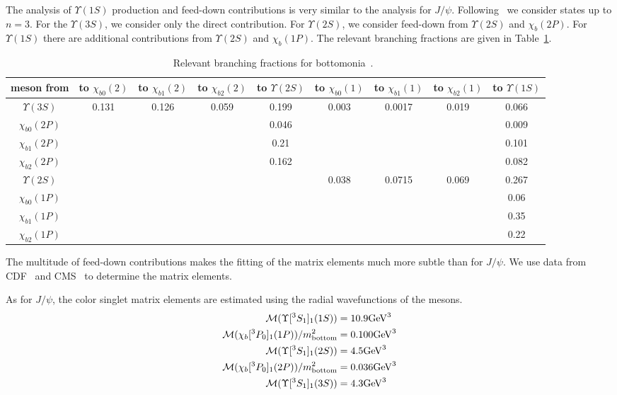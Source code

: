 \documentclass[article,showpacs,preprintnumbers,amsmath,amssymb]{revtex4}
\newcommand{\rGeV}{{\rm GeV}}
\newcommand{\bottom}{{\rm{bottom}}}
\begin{document}
\begin{appendix}
The analysis of $\Upsilon(1S)$ production and feed-down contributions is very
similar to the analysis for $J/\psi$. Following~\cite{Cho:1995ce,Cho:1995vh}
we consider states up to $n=3$. For the $\Upsilon(3S)$, we consider only the
direct contribution. For $\Upsilon(2S)$, we consider feed-down from
$\Upsilon(2S)$ and $\chi_b(2P)$. For $\Upsilon(1S)$ there are additional
contributions from $\Upsilon(2S)$ and $\chi_b(1P)$. The relevant branching
fractions are given in Table~\ref{table:BottomoniaBFs}.
\begin{table}[h]
\begin{tabular}{c|cccccccc}
meson from  &to $\chi_{b0}(2)$ &to $\chi_{b1}(2)$ &to $\chi_{b2}(2)$
            &to $\Upsilon(2S)$
            &to $\chi_{b0}(1)$ &to $\chi_{b1}(1)$ &to $\chi_{b2}(1)$ 
            &to $\Upsilon(1S)$\\ 
\hline
$\Upsilon(3S)$ & 0.131 & 0.126 & 0.059 
               & 0.199
               & 0.003 & 0.0017 & 0.019
               & 0.066\\
$\chi_{b0}(2P)$& & &
               & 0.046
               & & &
               & 0.009\\
$\chi_{b1}(2P)$& & &
               & 0.21
               & & &
               & 0.101\\
$\chi_{b2}(2P)$& & &  
               & 0.162
               & & &
               & 0.082\\
$\Upsilon(2S)$ & & &
               &
               & 0.038 & 0.0715 & 0.069 
               & 0.267\\
$\chi_{b0}(1P)$& & &  
               &
               & & &
               & 0.06\\
$\chi_{b1}(1P)$& & &
               &
               & & &
               & 0.35\\
$\chi_{b2}(1P)$& & &
               &
               & & &
               & 0.22\\
\end{tabular}
\caption{Relevant branching fractions for bottomonia~\cite{pdg}.~\label{table:BottomoniaBFs}}
\end{table}

The multitude of feed-down contributions makes the fitting of the matrix
elements much more subtle than for $J/\psi$. We use data from
CDF~\cite{Acosta:2001gv} and CMS~\cite{Khachatryan:2010zg} to determine the
matrix elements.

As for $J/\psi$, the color singlet matrix elements are estimated using the
radial wavefunctions of the mesons.
\begin{equation}
\begin{split}
{\cal{M}}(\Upsilon[^3S_1]_{1}(1S)) &= 10.9 \rGeV^3\\
{\cal{M}}(\chi_b[^3P_0]_{1}(1P))/m_{\bottom}^2 &= 0.100 \rGeV^3\\
{\cal{M}}(\Upsilon[^3S_1]_{1}(2S)) &= 4.5 \rGeV^3\\
{\cal{M}}(\chi_b[^3P_0]_{1}(2P))/m_{\bottom}^2 &= 0.036 \rGeV^3\\
{\cal{M}}(\Upsilon[^3S_1]_{1}(3S)) &= 4.3 \rGeV^3
\end{split}
\end{equation}


\end{appendix}
\end{document}
